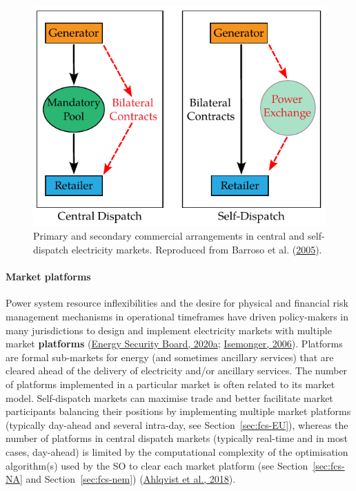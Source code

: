 \documentclass[12pt,a4paper,]{report}
\begin{document}
\begin{figure}
\hypertarget{fig:market_models}{%
\centering
\includegraphics{source/figures/market_models.pdf}
\caption[Primary and secondary commercial arrangements in central and
self-dispatch electricity markets]{Primary and secondary commercial
arrangements in central and self-dispatch electricity markets.
Reproduced from Barroso et al.
(\protect\hyperlink{ref-barrosoClassificationElectricityMarket2005}{2005}).}\label{fig:market_models}
}
\end{figure}

\hypertarget{sec:lit_review-operational_paradigms-markets-platforms}{%
\paragraph{Market
platforms}\label{sec:lit_review-operational_paradigms-markets-platforms}}

Power system resource inflexibilities and the desire for physical and
financial risk management mechanisms in operational timeframes have
driven policy-makers in many jurisdictions to design and implement
electricity markets with multiple market \textbf{platforms}
(\protect\hyperlink{ref-energysecurityboardSystemServicesAhead2020}{Energy
Security Board, 2020a};
\protect\hyperlink{ref-isemongerBenefitsRisksVirtual2006}{Isemonger,
2006}). Platforms are formal sub-markets for energy (and sometimes
ancillary services) that are cleared ahead of the delivery of
electricity and/or ancillary services. The number of platforms
implemented in a particular market is often related to its market model.
Self-dispatch markets can maximise trade and better facilitate market
participants balancing their positions by implementing multiple market
platforms (typically day-ahead and several intra-day, see
Section~\ref{sec:fcs-EU}), whereas the number of platforms in central
dispatch markets (typically real-time and in most cases, day-ahead) is
limited by the computational complexity of the optimisation algorithm(s)
used by the SO to clear each market platform (see
Section~\ref{sec:fcs-NA} and Section~\ref{sec:fcs-nem})
(\protect\hyperlink{ref-ahlqvistCentralSelfDispatchElectricity2018}{Ahlqvist
et al., 2018}).
\end{document}
